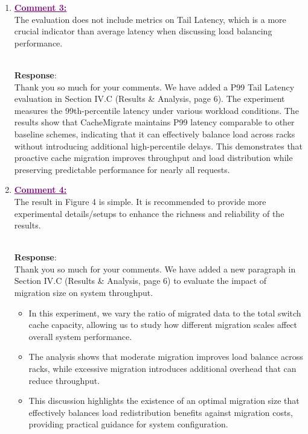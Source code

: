 \documentclass[11pt]{article}
\newenvironment{reply}
   {\medskip \noindent \color{blue} \begin{sf}\\ \textbf{Response}:\\  }
   {\medskip \par \end{sf}}
\newcommand{\comment}[1]{\textcolor{purple}{\textbf{\underline{Comment #1:}}}\\}
\DeclareRobustCommand{\thanksfor}[1]{Thank you so much for #1}
\begin{document}
\begin{enumerate}
    \item \comment{3} The evaluation does not include metrics on Tail Latency, which is a more crucial indicator than average latency when discussing load balancing performance.
          \begin{reply}
              \thanksfor{your comments}. We have added a P99 Tail Latency evaluation in Section IV.C (Results \& Analysis, page 6). The experiment measures the 99th-percentile latency under various workload conditions. The results show that CacheMigrate maintains P99 latency comparable to other baseline schemes, indicating that it can effectively balance load across racks without introducing additional high-percentile delays. This demonstrates that proactive cache migration improves throughput and load distribution while preserving predictable performance for nearly all requests.
          \end{reply}

    \item \comment{4} The result in Figure 4 is simple. It is recommended to provide more experimental details/setups to enhance the richness and reliability of the results.
          \begin{reply}
              \thanksfor{your comments}. We have added a new paragraph in Section IV.C (Results \& Analysis, page 6) to evaluate the impact of migration size on system throughput.
              \begin{itemize}
                  \item In this experiment, we vary the ratio of migrated data to the total switch cache capacity, allowing us to study how different migration scales affect overall system performance.
                  \item The analysis shows that moderate migration improves load balance across racks, while excessive migration introduces additional overhead that can reduce throughput.
                  \item This discussion highlights the existence of an optimal migration size that effectively balances load redistribution benefits against migration costs, providing practical guidance for system configuration.
              \end{itemize}
          \end{reply}
\end{enumerate}
\end{document}
